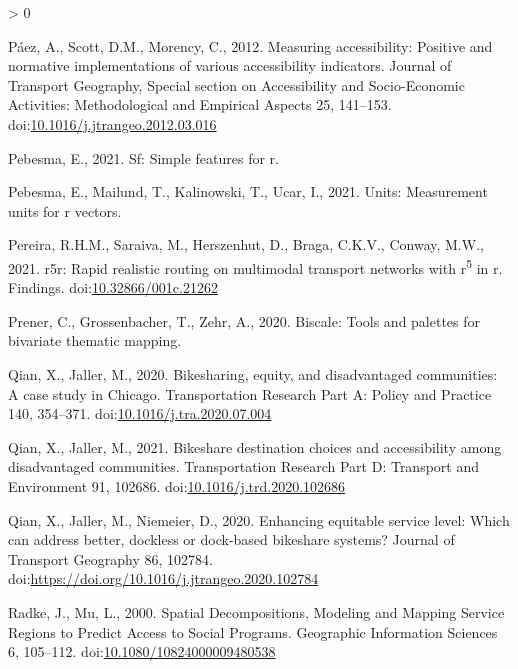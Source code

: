 \documentclass[]{elsarticle} %
\newlength{\cslhangindent}
\newenvironment{CSLReferences}[2] %
 {%
  \setlength{\parindent}{0pt}
  \ifodd #1 \everypar{\setlength{\hangindent}{\cslhangindent}}\ignorespaces\fi
  \ifnum #2 > 0
  \setlength{\parskip}{#2\baselineskip}
  \fi
 }%
 {}
\begin{document}
\begin{CSLReferences}{1}{0}
\leavevmode\hypertarget{ref-paezMeasuringAccessibilityPositive2012}{}%
Páez, A., Scott, D.M., Morency, C., 2012. Measuring accessibility:
Positive and normative implementations of various accessibility
indicators. Journal of Transport Geography, Special {section} on
{Accessibility} and {Socio}-{Economic Activities}: {Methodological} and
{Empirical Aspects} 25, 141--153.
doi:\href{https://doi.org/10.1016/j.jtrangeo.2012.03.016}{10.1016/j.jtrangeo.2012.03.016}

\leavevmode\hypertarget{ref-R-sf}{}%
Pebesma, E., 2021. Sf: Simple features for r.

\leavevmode\hypertarget{ref-R-units}{}%
Pebesma, E., Mailund, T., Kalinowski, T., Ucar, I., 2021. Units:
Measurement units for r vectors.

\leavevmode\hypertarget{ref-Pereira2021r5r}{}%
Pereira, R.H.M., Saraiva, M., Herszenhut, D., Braga, C.K.V., Conway,
M.W., 2021. r5r: Rapid realistic routing on multimodal transport
networks with r\textsuperscript{5} in r. Findings.
doi:\href{https://doi.org/10.32866/001c.21262}{10.32866/001c.21262}

\leavevmode\hypertarget{ref-R-biscale}{}%
Prener, C., Grossenbacher, T., Zehr, A., 2020. Biscale: Tools and
palettes for bivariate thematic mapping.

\leavevmode\hypertarget{ref-qianBikesharingEquityDisadvantaged2020}{}%
Qian, X., Jaller, M., 2020. Bikesharing, equity, and disadvantaged
communities: {A} case study in {Chicago}. Transportation Research Part
A: Policy and Practice 140, 354--371.
doi:\href{https://doi.org/10.1016/j.tra.2020.07.004}{10.1016/j.tra.2020.07.004}

\leavevmode\hypertarget{ref-qianBikeshareDestinationChoices2021}{}%
Qian, X., Jaller, M., 2021. Bikeshare destination choices and
accessibility among disadvantaged communities. Transportation Research
Part D: Transport and Environment 91, 102686.
doi:\href{https://doi.org/10.1016/j.trd.2020.102686}{10.1016/j.trd.2020.102686}

\leavevmode\hypertarget{ref-qianEnhancingEquitableService2020}{}%
Qian, X., Jaller, M., Niemeier, D., 2020. Enhancing equitable service
level: Which can address better, dockless or dock-based bikeshare
systems? Journal of Transport Geography 86, 102784.
doi:\url{https://doi.org/10.1016/j.jtrangeo.2020.102784}

\leavevmode\hypertarget{ref-radkeSpatialDecompositionsModeling2000}{}%
Radke, J., Mu, L., 2000. Spatial {Decompositions}, {Modeling} and
{Mapping Service Regions} to {Predict Access} to {Social Programs}.
Geographic Information Sciences 6, 105--112.
doi:\href{https://doi.org/10.1080/10824000009480538}{10.1080/10824000009480538}


\end{CSLReferences}
\end{document}
